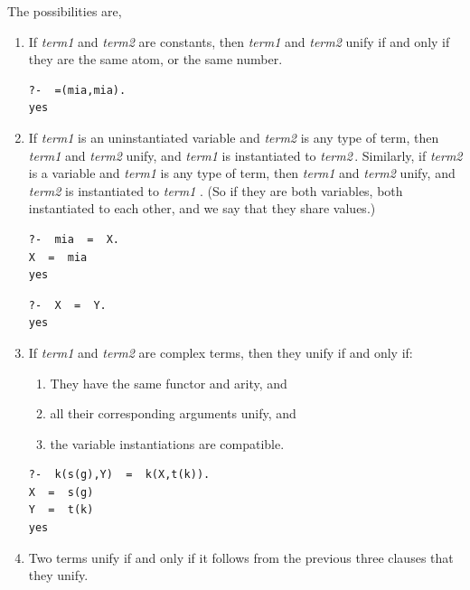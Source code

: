 \documentclass[thesis-solanki.tex]{subfiles}
\providecommand\metaSyntacticVariable[1]{\textsl{\ttfamily #1}}
\providecommand\mSV{\metaSyntacticVariable}
\begin{document}
The possibilities are,
\begin{enumerate}
\item If \mSV{term1} and \mSV{term2} are constants, then \mSV{term1} and \mSV{term2} unify if and only if they
  are the same atom, or the same number.
\begin{code-list}[h]
\begin{verbatim}
?-  =(mia,mia).
yes
\end{verbatim}
\end{code-list}

\item If \mSV{term1} is an uninstantiated variable and \mSV{term2} is any type of term, then \mSV{term1}
  and \mSV{term2} unify, and \mSV{term1} is instantiated to \mSV{term2}\,.
  Similarly, if \mSV{term2} is a variable and \mSV{term1} is any type of term, then \mSV{term1} and \mSV{term2}
  unify, and \mSV{term2} is instantiated to \mSV{term1} . (So if they are both 
variables,  both instantiated to each other, and we say that they share values.)
\begin{code-list}[h]
\begin{verbatim}
?-  mia  =  X.
X  =  mia
yes
\end{verbatim}

\begin{verbatim}
?-  X  =  Y.
yes
\end{verbatim}
\end{code-list}

\item If \mSV{term1} and \mSV{term2} are complex terms, then they unify if and only if:

\begin{enumerate}
\item They have the same functor and arity, and

\item all their corresponding arguments unify, and

\item the variable instantiations are compatible.
\end{enumerate}
\begin{code-list}[h]

\begin{verbatim}
?-  k(s(g),Y)  =  k(X,t(k)).
X  =  s(g)
Y  =  t(k)
yes
\end{verbatim}
\end{code-list}


\item Two terms unify if and only if it follows from the previous three clauses that they unify.
\end{enumerate}
\end{document}
